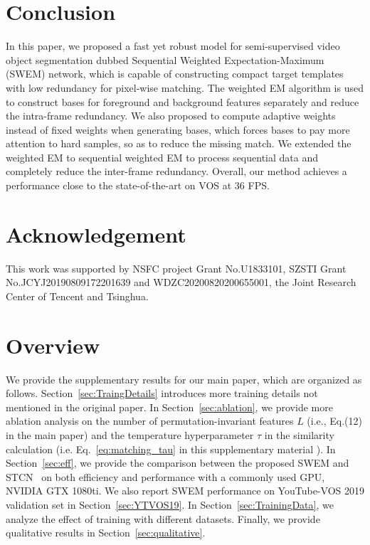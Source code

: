  

\section{Conclusion}
In this paper, we proposed a fast yet robust model for semi-supervised video object segmentation dubbed Sequential Weighted Expectation-Maximum (SWEM) network, which is capable of constructing compact target templates with low redundancy for pixel-wise matching. The weighted EM algorithm is used to construct bases for foreground and background features separately and reduce the intra-frame redundancy. We also proposed to compute adaptive weights instead of fixed weights when generating bases, which forces bases to pay more attention to hard samples, so as to reduce the missing match. We extended the weighted EM to sequential weighted EM to process sequential data and completely reduce the inter-frame redundancy. Overall, our method achieves a performance close to the state-of-the-art on VOS at 36 FPS.

\section*{Acknowledgement}
\vspace{-0.0 cm}
This work was supported by NSFC project Grant No.U1833101, SZSTI Grant No.JCYJ20190809172201639 and WDZC20200820200655001, the Joint Research Center of Tencent and Tsinghua.

{\small
}

\clearpage
\appendix
\renewcommand{\appendixname}{Appendix~\Alph{section}}
\section{Overview}
We provide the supplementary results for our main paper, which are organized as follows. Section~\ref{sec:TraingDetails} introduces more training details not mentioned in the original paper. In Section~\ref{sec:ablation}, we provide more ablation analysis on the number of permutation-invariant features $L$ (i.e.,  Eq.(12) in the main paper) and the temperature hyperparameter $\tau$ in the similarity calculation (i.e. Eq.~\ref{eq:matching_tau} in this supplementary material ). In Section~\ref{sec:eff}, we provide the comparison between the proposed SWEM and STCN~\cite{cheng2021stcn} on both efficiency and performance with a commonly used GPU, NVIDIA GTX 1080ti. We also report SWEM performance on YouTube-VOS 2019 validation set in Section~\ref{sec:YTVOS19}. In Section~\ref{sec:TrainingData}, we analyze the effect of training with different datasets. Finally, we provide qualitative results in Section~\ref{sec:qualitative}.

